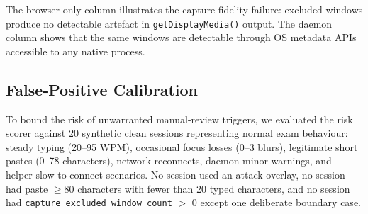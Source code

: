 \documentclass[conference]{IEEEtran}
\begin{document}
\begin{table}[t]
\centering
\small
\caption{Browser-Only vs.\ Daemon-Augmented Detection}
\label{tab:comparison}
\end{table}

The browser-only column illustrates the capture-fidelity failure: excluded windows produce no detectable artefact in \texttt{getDisplayMedia()} output. The daemon column shows that the same windows are detectable through OS metadata APIs accessible to any native process.

\subsection{False-Positive Calibration}

To bound the risk of unwarranted manual-review triggers, we evaluated the risk scorer against 20 synthetic clean sessions representing normal exam behaviour: steady typing (20--95 WPM), occasional focus losses (0--3 blurs), legitimate short pastes (0--78 characters), network reconnects, daemon minor warnings, and helper-slow-to-connect scenarios. No session used an attack overlay, no session had paste $\geq 80$ characters with fewer than 20 typed characters, and no session had \texttt{capture\_excluded\_window\_count} $>$ 0 except one deliberate boundary case.
\end{document}
